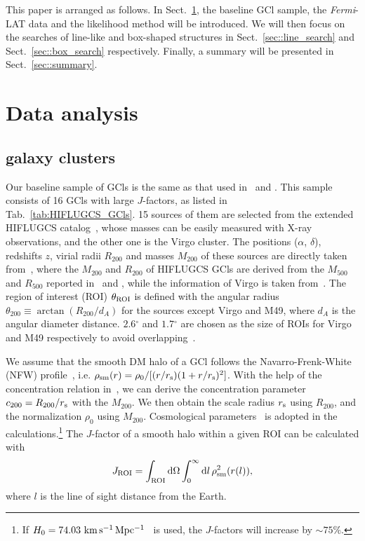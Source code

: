 \documentclass[
	twocolumn,
]{aastex6} %
\newcommand{\lat}{\emph{Fermi}-LAT\xspace}
\renewcommand{\deg}{\ensuremath{^{\circ}}\xspace}
\begin{document}
This paper is arranged as follows.
In Sect.~\ref{sec::data_analysis}, the baseline GCl sample, the \lat data and the likelihood method will be introduced.
We will then focus on the searches of line-like and box-shaped structures in Sect.~\ref{sec::line_search} and Sect.~\ref{sec::box_search} respectively.
Finally, a summary will be presented in Sect.~\ref{sec::summary}.

\section{Data analysis}\label{sec::data_analysis}
\subsection{galaxy clusters}
Our baseline sample of GCls is the same as that used in~\citet{Anderson2016} and \citet{Liang2016}.
This sample consists of 16 GCls with large $J$-factors, as listed in Tab.~\ref{tab:HIFLUGCS_GCls}.
15 sources of them are selected from the extended HIFLUGCS catalog~\citep{Reiprich2002,Chen2007}, whose masses can be easily measured with X-ray observations, and the other one is the Virgo cluster.
The positions ($\alpha$, $\delta$), redshifts $z$, virial radii $R_{200}$ and masses $M_{200}$ of these sources are directly taken from~\citet{Anderson2016}, where the $M_{200}$ and $R_{200}$ of HIFLUGCS GCls are derived from the $M_{500}$ and $R_{500}$ reported in~\citet{Reiprich2002} and \citet{Chen2007}, while the information of Virgo is taken from~\citet{Fouque2001}.
The region of interest (ROI) $\theta_{\rm ROI}$ is defined with the angular radius $\theta_{200}\equiv \arctan (R_{200}/d_A)$ for the sources except Virgo and M49, where $d_A$ is the angular diameter distance.
$2.6\deg$ and $1.7\deg$ are chosen as the size of ROIs for Virgo and M49 respectively to avoid overlapping~\citep{Liang2016}.

We assume that the smooth DM halo of a GCl follows the Navarro-Frenk-White (NFW) profile~\citep{Navarro1997}, i.e. $\rho_{\rm sm}(r) = \rho_0 / [(r/r_{\rm s})(1+r/r_{\rm s})^2]$.
With the help of the concentration relation in~\citet{SanchezConde2014}, we can derive the concentration parameter $c_{200}=R_{200}/r_{\rm s}$ with the $M_{200}$.
We then obtain the scale radius $r_{\rm s}$ using $R_{200}$, and the normalization $\rho_0$ using $M_{200}$.
Cosmological parameters~\citep{Aghanim2018} is adopted in the calculations.\footnote{If $H_0=74.03~\rm km\,s^{-1}\,Mpc^{-1}$~\citep{Riess2019} is used, the $J$-factors will increase by $\sim 75\%$.}
The $J$-factor of a smooth halo within a given ROI can be calculated with
\begin{equation}
	J_{\rm ROI}=\int_{\rm ROI} {\rm d} \Omega \int_0^\infty {\rm d}l\,\rho_{\rm sm}^2(r(l)),
\end{equation}
where $l$ is the line of sight distance from the Earth.
\end{document}
